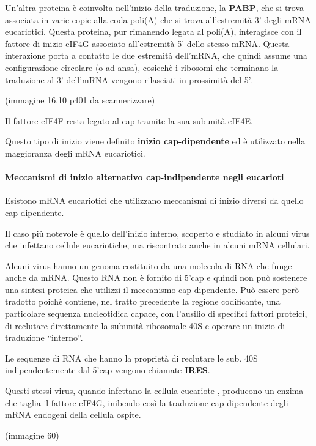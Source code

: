 \documentclass[11pt]{book}
\begin{document}
Un'altra proteina è coinvolta nell'inizio della traduzione, la
\textbf{PABP}, che si trova associata in varie copie alla coda poli(A)
che si trova all'estremità 3' degli mRNA eucariotici. Questa proteina,
pur rimanendo legata al poli(A), interagisce con il fattore di inizio
eIF4G associato all'estremità 5' dello stesso mRNA. Questa interazione
porta a contatto le due estremità dell'mRNA, che quindi assume una
configurazione circolare (o ad ansa), cosicchè i ribosomi che terminano
la traduzione al 3' dell'mRNA vengono rilasciati in prossimità del 5'.

(immagine 16.10 p401 da scannerizzare)

Il fattore eIF4F resta legato al cap tramite la sua subunità eIF4E.

Questo tipo di inizio viene definito \textbf{inizio cap-dipendente} ed è
utilizzato nella maggioranza degli mRNA eucariotici.

\paragraph{Meccanismi di inizio alternativo cap-indipendente negli
eucarioti}\label{meccanismi-di-inizio-alternativo-cap-indipendente-negli-eucarioti}

Esistono mRNA eucariotici che utilizzano meccanismi di inizio diversi da
quello cap-dipendente.

Il caso più notevole è quello dell'inizio interno, scoperto e studiato
in alcuni virus che infettano cellule eucariotiche, ma riscontrato anche
in alcuni mRNA cellulari.

Alcuni virus hanno un genoma costituito da una molecola di RNA che funge
anche da mRNA. Questo RNA non è fornito di 5'cap e quindi non può
sostenere una sintesi proteica che utilizzi il meccanismo
cap-dipendente. Può essere però tradotto poichè contiene, nel tratto
precedente la regione codificante, una particolare sequenza nucleotidica
capace, con l'ausilio di specifici fattori proteici, di reclutare
direttamente la subunità ribosomale 40S e operare un inizio di
traduzione ``interno''.

Le sequenze di RNA che hanno la proprietà di reclutare le sub. 40S
indipendentemente dal 5'cap vengono chiamate \textbf{IRES}.

Questi stessi virus, quando infettano la cellula eucariote , producono
un enzima che taglia il fattore eIF4G, inibendo così la traduzione
cap-dipendente degli mRNA endogeni della cellula ospite.

(immagine 60)
\end{document}
